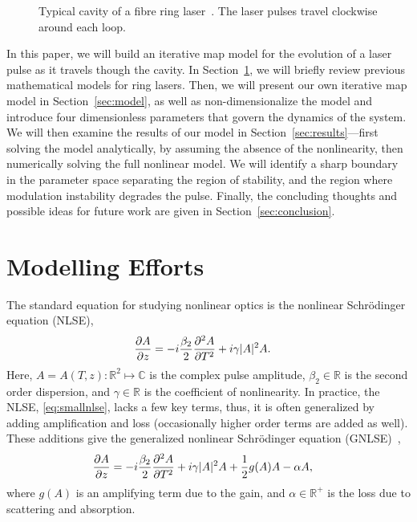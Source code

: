 \documentclass[9pt,twocolumn,twoside]{osajnl}
\newcommand{\pdiff}[3][\hspace{-0.5pt}]{\frac{\partial^{#1}#2}{\partial{#3}^{#1}}} %
\begin{document}
\begin{figure}[tbp]
	\centering
	
	\caption{Typical cavity of a fibre ring laser~\cite{burgoyne2014, chung2017, lapre2019, shao2019}. The laser pulses travel clockwise around each loop.}
	\label{fig:cavity}
\end{figure}

In this paper, we will build an iterative map model for the evolution of a laser pulse as it travels though the cavity. In Section~\ref{sec:modelling}, we will briefly review previous mathematical models for ring lasers. Then, we will present our own iterative map model in Section~\ref{sec:model}, as well as non-dimensionalize the model and introduce four dimensionless parameters that govern the dynamics of the system. We will then examine the results of our model in Section~\ref{sec:results}---first solving the model analytically, by assuming the absence of the nonlinearity, then numerically solving the full nonlinear model. We will identify a sharp boundary in the parameter space separating the region of stability, and the region where modulation instability degrades the pulse. Finally, the concluding thoughts and possible ideas for future work are given in Section~\ref{sec:conclusion}.

\section{Modelling Efforts}
\label{sec:modelling}
The standard equation for studying nonlinear optics is the nonlinear Schr\"odinger equation (NLSE),
\begin{align}
	\pdiff{A}{z} &= - i \frac{\beta_2}{2}\pdiff[2]{A}{T} + i \gamma |A|^2 A.
	\label{eq:smallnlse}
\end{align}
Here, $A = A(T, z) : \mathbb{R}^2 \mapsto \mathbb{C}$ is the complex pulse amplitude, $\beta_2 \in \mathbb{R}$ is the second order dispersion, and $\gamma \in \mathbb{R}$ is the coefficient of nonlinearity. In practice, the NLSE, \eqref{eq:smallnlse}, lacks a few key terms, thus, it is often generalized by adding amplification and loss (occasionally higher order terms are added as well). These additions give the generalized nonlinear Schr\"{o}dinger equation (GNLSE)~\cite{agrawal2013, bohun2015, finot2008, peng2018, shtyrina2017, yarutkina2013},
	\begin{align}
	\pdiff{A}{z} &= - i \frac{\beta_2}{2}\pdiff[2]{A}{T} + i \gamma |A|^2 A + \frac{1}{2}g(A) A - \alpha A,
	\label{eq:nlse}
\end{align}
where $g(A)$ is an amplifying term due to the gain, and $\alpha \in \mathbb{R}^+$ is the loss due to scattering and absorption.
\end{document}
